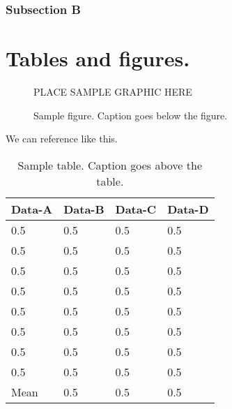 \documentclass[master,dense]{thesis}
\begin{document}
\subsection{Subsection B}

\chapter{Tables and figures.}
\label{chap:tables.and.figs}

\begin{figure}[hp] %
    PLACE SAMPLE GRAPHIC HERE
    \caption{Sample figure.  Caption goes below the figure.}
    \label{fig:sample}
\end{figure}

We can reference  like this.

\begin{table*}[hp]
    \caption{Sample table.  Caption goes above the table.}
    \label{table:sample}
    \begin{center}
        \begin{tabular}{@{}*{4}{l}} %
            \toprule
            Data-A  & Data-B    & Data-C    & Data-D \\
            \midrule
            0.5     & 0.5       & 0.5       & 0.5   \\
            0.5     & 0.5       & 0.5       & 0.5   \\
            0.5     & 0.5       & 0.5       & 0.5   \\
            0.5     & 0.5       & 0.5       & 0.5   \\
            0.5     & 0.5       & 0.5       & 0.5   \\
            0.5     & 0.5       & 0.5       & 0.5   \\
            0.5     & 0.5       & 0.5       & 0.5   \\
            0.5     & 0.5       & 0.5       & 0.5   \\
            \midrule
            Mean    & 0.5       & 0.5       & 0.5   \\
            \bottomrule
        \end{tabular}
    \end{center}
\end{table*}
\end{document}
